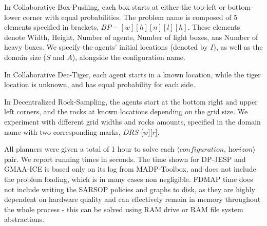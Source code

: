 \documentclass[letterpaper]{article}
\theoremstyle{definition}
\newcommand{\eliran}[1]{\textbf{[\color{red}ELIRAN:#1]}}
\newcommand{\cbp}[0]{Collaborative Box-Pushing}
\newcommand{\cdt}[0]{Collaborative Dec-Tiger}
\newcommand{\drs}[0]{Decentralized Rock-Sampling}
\begin{document}
In \cbp, each box starts at either the top-left or bottom-lower corner with equal probabilities. The problem name is composed of 5 elements specified in brackets, $\textit{BP}-[w][h][n][l][h]$. These
elements denote
Width, Height, Number of agents, Number of light boxes, ans Number of heavy boxes.
We specify the agents' initial locations (denoted by $I$), as well as the domain size ($S$ and $A$), alongside the configuration name.

In \cdt, each agent starts in a known location, while the tiger location is unknown, and has equal probability for each side.

In \drs, the agents start at the bottom right and upper left corners, and the rocks at known locations depending on the grid size. We experiment with different grid widths and rocks amounts, specified in the domain name with two corresponding marks, $\textit{DRS-[w][r]}$.

All planners were given a total of 1 hour  to solve each $\langle\textit{configuration, horizon}\rangle$ pair. We report running times in seconds. The time shown for DP-JESP and GMAA-ICE is based only on its log from MADP-Toolbox, and does not include the problem loading, which is in many cases non negligible. FDMAP time does not include writing the SARSOP policies and graphs to disk, as they are highly dependent on hardware quality and can effectively remain in memory throughout the whole process - this can be solved using RAM drive or RAM file system abstractions.


\end{document}
